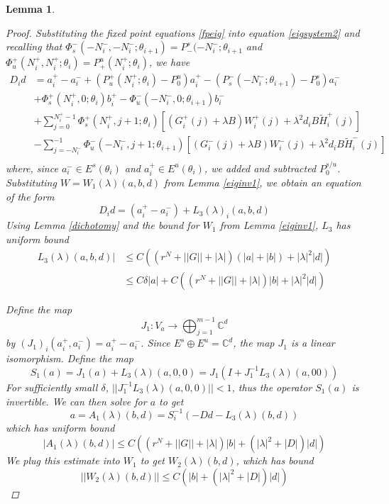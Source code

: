 \documentclass[12pt]{article}
\def\C{{\mathbb C}}
\newtheorem{lemma}{Lemma}
\begin{document}
\begin{lemma}
\begin{proof}
Substituting the fixed point equations \eqref{fpeig} into equation \eqref{eigsystem2} and recalling that $\Phi_s^-(-N_i^-, -N_i^-; \theta_{i+1}) = P_-^s(-N_i^-; \theta_{i+1}$ and $\Phi_u^+(N_i^+, N_i^+; \theta_i) = P_+^u(N_i^+; \theta_{i})$, we have
\begin{align}
D_i d &= a_i^+ - a_i^- + (P_u^+(N_i^+; \theta_i) - P_0^u) a_i^+ - (P_s^-(-N_i^-; \theta_{i+1}) - P_0^s) a_i^- \\
&+ \Phi_s^+(N_i^+, 0; \theta_i) b_i^+ - \Phi_u^-(-N_i^-, 0; \theta_{i+1}) b_i^- \nonumber \\
&+ \sum_{j = 0}^{N_i^+-1} \Phi_s^+(N_i^+, j+1; \theta_i) 
[(G_i^+(j) + \lambda B) W_i^+(j) + \lambda^2 d_i B \tilde{H}_i^+(j)] \nonumber \\
&- \sum_{j = -N_i^-}^{-1} \Phi_u^-(-N_i^-, j+1; \theta_{i+1}) 
[(G_i^-(j) + \lambda B) W_i^-(j) + \lambda^2 d_i B \tilde{H}_i^-(j)] \nonumber \\
\end{align}
where, since $a_i^- \in E^s(\theta_i)$ and $a_i^+ \in E^u(\theta_i)$, we added and subtracted $P_0^{s/u}$. Substituting $W = W_1(\lambda)(a, b, d)$ from Lemma \ref{eiginv1}, we obtain an equation of the form 
\begin{equation}\label{Dideq}
D_i d = (a_i^+ - a_i^-) + L_3(\lambda)_i(a,b,d)
\end{equation}
Using Lemma \ref{dichotomy} and the bound for $W_1$ from Lemma \ref{eiginv1}, $L_3$ has uniform bound
\begin{align}\label{L3bound}
L_3(\lambda)(a,b,d)| &\leq C\left( (r^N + ||G|| + |\lambda| ) (|a| + |b|) + |\lambda|^2 |d|  \right) \\
&\leq C \delta |a| + C\left( (r^N + ||G|| + |\lambda| ) |b| + |\lambda|^2 |d|  \right) \nonumber
\end{align}

Define the map
\[
J_1: V_a \rightarrow \bigoplus_{j=1}^{m-1} \C^d
\]
by $(J_1)_i(a_i^+, a_i^-) = a_i^+ - a_i^-$. Since $E^s \oplus E^u = \C^d$, the map $J_1$ is a linear isomorphism. Define the map
\[
S_1(a) = J_1 (a) + L_3(\lambda)(a, 0, 0) = J_1( I + J_1^{-1} L_3(\lambda)(a, 0 0) )
\]
For sufficiently small $\delta$, $||J_1^{-1} L_3(\lambda)(a, 0, 0)|| < 1$, thus the operator $S_1(a)$ is invertible. We can then solve for $a$ to get
\[
a = A_1(\lambda)(b, d) = S_i^{-1}(-D d - L_3(\lambda)(b, d))
\]
which has uniform bound
\begin{equation*}
|A_1(\lambda)(b, d)| \leq C \left( (r^N + ||G|| + |\lambda| ) |b| + (|\lambda|^2 + |D| ) |d|  \right)
\end{equation*}
We plug this estimate into $W_1$ to get $W_2(\lambda)(b,d)$, which has bound
\begin{equation*}
||W_2(\lambda)(b,d)|| \leq C \left( |b| + (|\lambda|^2 + |D|) |d| \right)
\end{equation*}


\end{proof}
\end{lemma}
\end{document}
